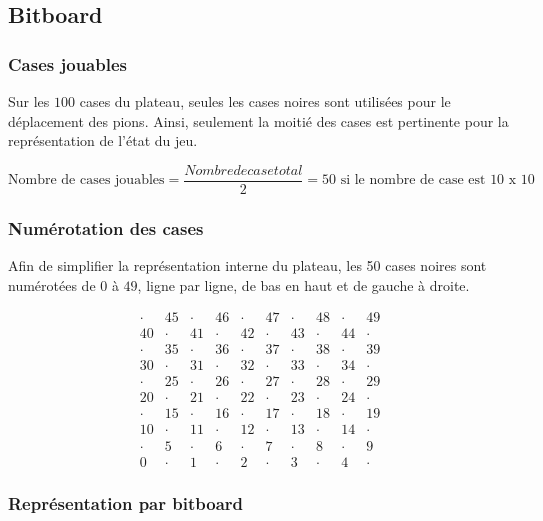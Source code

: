 \documentclass[11pt,a4paper]{article}
\begin{document}
\subsection{Bitboard}


\subsubsection{Cases jouables}

Sur les \(100\) cases du plateau, seules les cases noires sont
utilisées pour le déplacement des pions.
Ainsi, seulement la moitié des cases est pertinente pour la
représentation de l'état du jeu.

\[
\text{Nombre de cases jouables} = \frac{Nombre de case total}{2} = 50 \text{ si le nombre de case est \(10\) x \(10\)}
\]

\subsubsection{Numérotation des cases}

Afin de simplifier la représentation interne du plateau, les
50 cases noires sont numérotées de \(0\) à \(49\), ligne par
ligne, de bas en haut et de gauche à droite.

\[
\begin{array}{cccccccccc}
\cdot & 45 & \cdot & 46 & \cdot & 47 & \cdot & 48 & \cdot & 49 \\
40 & \cdot & 41 & \cdot & 42 & \cdot & 43 & \cdot & 44 & \cdot \\
\cdot & 35 & \cdot & 36 & \cdot & 37 & \cdot & 38 & \cdot & 39 \\
30 & \cdot & 31 & \cdot & 32 & \cdot & 33 & \cdot & 34 & \cdot \\
\cdot & 25 & \cdot & 26 & \cdot & 27 & \cdot & 28 & \cdot & 29 \\
20 & \cdot & 21 & \cdot & 22 & \cdot & 23 & \cdot & 24 & \cdot \\
\cdot & 15 & \cdot & 16 & \cdot & 17 & \cdot & 18 & \cdot & 19 \\
10 & \cdot & 11 & \cdot & 12 & \cdot & 13 & \cdot & 14 & \cdot \\
\cdot & 5 & \cdot & 6 & \cdot & 7 & \cdot & 8 & \cdot & 9 \\
0 & \cdot & 1 & \cdot & 2 & \cdot & 3 & \cdot & 4 & \cdot
\end{array}
\]

\subsubsection{Représentation par bitboard}
\end{document}
